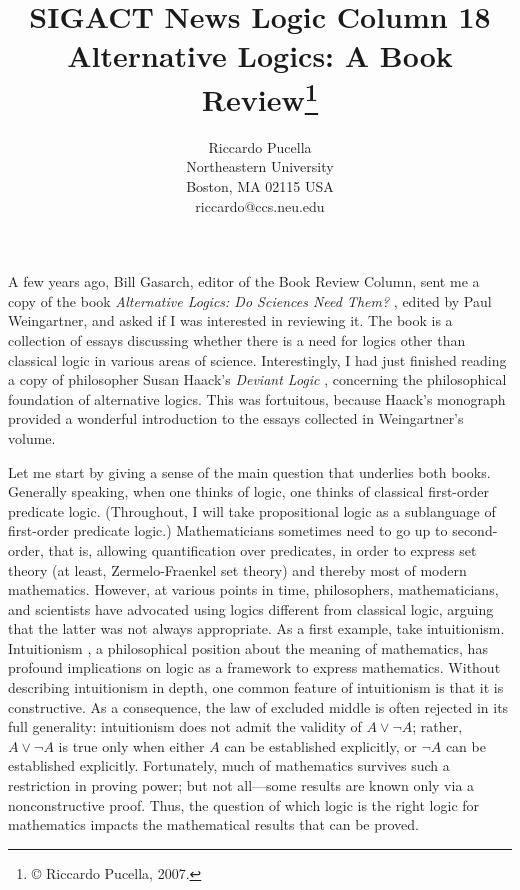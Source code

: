 \documentclass[11pt]{article}
\title{SIGACT News Logic Column 18\\[2ex]
\textbf{Alternative Logics: A Book Review}\footnote{\copyright{} Riccardo Pucella, 2007.}}
\author{Riccardo Pucella\\
Northeastern University\\
Boston, MA 02115 USA\\
riccardo@ccs.neu.edu}
\date{}
\newcommand{\<}{\langle}
\renewcommand{\>}{\rangle}
\begin{document}
\SIGACTmaketitle

A few years ago, Bill Gasarch, editor of the Book Review Column, sent
me a copy of the book \emph{Alternative Logics: Do Sciences Need Them?}
\cite{r:weingartner04}, edited by Paul Weingartner, and asked if I was
interested in reviewing it.  
The book is a collection of essays discussing whether there is a need
for logics other than classical logic in various areas of science.
Interestingly, I had just finished reading a copy of philosopher Susan
Haack's \emph{Deviant Logic} \cite{r:haack74}, concerning the
philosophical foundation of alternative logics.  
This was fortuitous, because Haack's monograph provided a wonderful
introduction to the essays collected in Weingartner's volume.

Let me start by giving a sense of the main question that underlies
both books.  Generally speaking, when one thinks of logic, one thinks
of classical first-order predicate logic. 
(Throughout, I will take propositional logic as a sublanguage of
first-order predicate logic.)
Mathematicians sometimes need to go up to second-order, that is,
allowing quantification over predicates, in order to express set
theory (at least, Zermelo-Fraenkel set theory) and thereby most of
modern mathematics. 
However, at various points in time, philosophers, mathematicians, and
scientists have advocated using logics different from classical logic,
arguing that the latter was not always appropriate. 
As a first example, take intuitionism. 
Intuitionism \cite{r:heyting71}, a philosophical position about the
meaning of mathematics, has profound implications on logic as a
framework to express mathematics. 
Without describing intuitionism in depth, one common feature of
intuitionism is that it is constructive. 
As a consequence,  the law of excluded middle is often
rejected in its full generality: intuitionism does not admit the
validity of $A\lor\neg A$; 
rather, $A\lor\neg A$ is true only when either $A$ can be established
explicitly, or $\neg A$ can be established explicitly. 
Fortunately, much of mathematics survives such a restriction in
proving power; but not all---some results are known only via a
nonconstructive proof. 
Thus, the question of which logic is the right logic for mathematics
impacts the mathematical results that can be proved.
\end{document}
